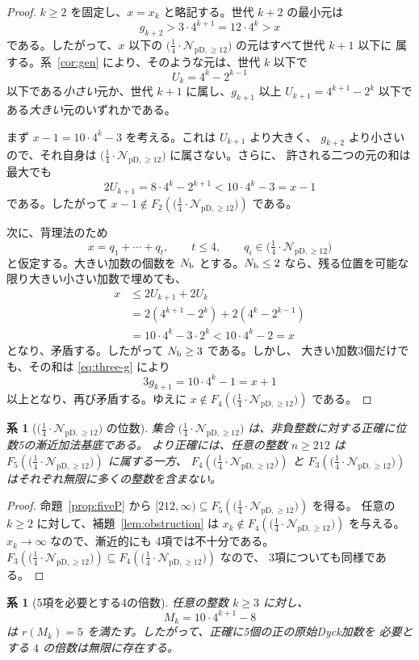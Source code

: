 \documentclass[12pt]{ltjsarticle}
\theoremstyle{plain}
\newtheorem{corollary}[theorem]{系}
\theoremstyle{definition}
\theoremstyle{plain}
\newcommand{\Pset}{%
  \bigl(\tfrac{1}{4}\cdot\mathcal{N}_{\mathrm{pD},\geq 12}\bigr)%
}
\begin{document}
\begin{proof}
$k\geq2$ を固定し、$x=x_k$ と略記する。世代 $k+2$ の最小元は
\[
 g_{k+2}>3\cdot4^{k+1}=12\cdot4^k>x
\]
である。したがって、$x$ 以下の $\Pset$ の元はすべて世代 $k+1$ 以下に
属する。系~\ref{cor:gen} により、そのような元は、世代 $k$ 以下で
\[
 U_k=4^k-2^{k-1}
\]
以下である\emph{小さい}元か、世代 $k+1$ に属し、$g_{k+1}$ 以上
$U_{k+1}=4^{k+1}-2^k$ 以下である\emph{大きい}元のいずれかである。

まず $x-1=10\cdot4^k-3$ を考える。これは $U_{k+1}$ より大きく、
$g_{k+2}$ より小さいので、それ自身は $\Pset$ に属さない。さらに、
許される二つの元の和は最大でも
\[
 2U_{k+1}=8\cdot4^k-2^{k+1}<10\cdot4^k-3=x-1
\]
である。したがって $x-1\notin F_2(\Pset)$ である。

次に、背理法のため
\[
 x=q_1+\cdots+q_t,
 \qquad t\leq4,
 \qquad q_i\in\Pset
\]
と仮定する。大きい加数の個数を $N_{\rm b}$ とする。$N_{\rm b}\leq2$
なら、残る位置を可能な限り大きい小さい加数で埋めても、
\begin{align*}
 x
 &\leq2U_{k+1}+2U_k\\
 &=2(4^{k+1}-2^k)+2(4^k-2^{k-1})\\
 &=10\cdot4^k-3\cdot2^k
 <10\cdot4^k-2=x
\end{align*}
となり、矛盾する。したがって $N_{\rm b}\geq3$ である。しかし、
大きい加数3個だけでも、その和は \eqref{eq:three-g} により
\[
 3g_{k+1}=10\cdot4^k-1=x+1
\]
以上となり、再び矛盾する。ゆえに $x\notin F_4(\Pset)$ である。
\end{proof}

\begin{corollary}[$\Pset$ の位数]\label{cor:orderfive}
集合 $\Pset$ は、非負整数に対する正確に位数5の漸近加法基底である。
より正確には、任意の整数 $n\geq212$ は $F_5(\Pset)$ に属する一方、
$F_4(\Pset)$ と $F_3(\Pset)$ はそれぞれ無限に多くの整数を含まない。
\end{corollary}

\begin{proof}
命題~\ref{prop:fiveP} から $[212,\infty)\subseteq F_5(\Pset)$ を得る。
任意の $k\geq2$ に対して、補題~\ref{lem:obstruction} は
$x_k\notin F_4(\Pset)$ を与える。$x_k\to\infty$ なので、漸近的にも
4項では不十分である。$F_3(\Pset)\subseteq F_4(\Pset)$ なので、
3項についても同様である。
\end{proof}

\begin{corollary}[5項を必要とする4の倍数]
\label{cor:five-multiples}
任意の整数 $k\geq3$ に対し、
\[
 M_k=10\cdot4^{k+1}-8
\]
は $r(M_k)=5$ を満たす。したがって、正確に5個の正の原始Dyck加数を
必要とする $4$ の倍数は無限に存在する。
\end{corollary}
\end{document}
